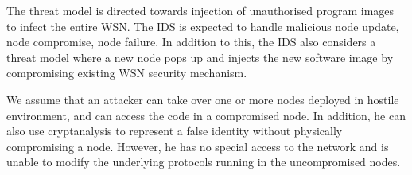 \documentclass[conference]{IEEEtran}
\newcommand{\notedme}[1]{\raisebox{0pt}[0pt][0pt]{\pdfcomment[open=true,color=blue]{#1}}}
\begin{document}
The threat model is directed towards injection of unauthorised program images to infect the entire WSN.
The IDS is expected to handle malicious node update, node compromise, node failure.
In addition to this, the IDS also considers a threat model where a new node pops up and injects the new software image by compromising existing WSN security mechanism.

We assume that an  attacker  can take over one or more nodes deployed in hostile environment, and can access the code in a compromised node. 
In addition, he can also use cryptanalysis to represent a false identity without physically compromising a node.
However, he has  no special  access to  the  network and is unable to modify the underlying protocols running in the uncompromised nodes.
\end{document}
